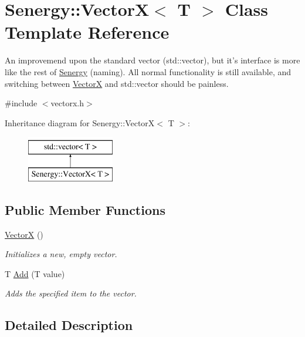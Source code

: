 \hypertarget{class_senergy_1_1_vector_x}{\section{Senergy\-:\-:Vector\-X$<$ T $>$ Class Template Reference}
\label{class_senergy_1_1_vector_x}
}


An improvemend upon the standard vector (std\-::vector), but it's interface is more like the rest of \hyperlink{namespace_senergy}{Senergy} (naming). All normal functionality is still available, and switching between \hyperlink{class_senergy_1_1_vector_x}{Vector\-X} and std\-::vector should be painless.  




{\ttfamily \#include $<$vectorx.\-h$>$}

Inheritance diagram for Senergy\-:\-:Vector\-X$<$ T $>$\-:\begin{figure}[H]
\begin{center}
\leavevmode
\includegraphics[height=2.000000cm]{class_senergy_1_1_vector_x}
\end{center}
\end{figure}
\subsection*{Public Member Functions}
\begin{DoxyCompactItemize}
\item 
\hyperlink{class_senergy_1_1_vector_x_a99bed6d49a3a93e6a133837330218ee7}{Vector\-X} ()
\begin{DoxyCompactList}\small\item\em Initializes a new, empty vector. \end{DoxyCompactList}\item 
T \hyperlink{class_senergy_1_1_vector_x_a4df34dceed944ef14df649a538d9c1b1}{Add} (T value)
\begin{DoxyCompactList}\small\item\em Adds the specified item to the vector. \end{DoxyCompactList}\end{DoxyCompactItemize}


\subsection{Detailed Description}
